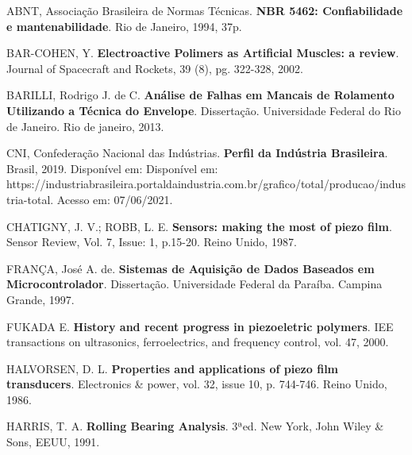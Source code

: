 \documentclass[
	12pt,				
	oneside,			
	a4paper,			
	english,			
	brazil,			
	]{abntex2ppgsi}
\begin{document}
\postextual


%


\begin{thebibliography}{9}

  ABNT, Associação Brasileira de Normas Técnicas.
  \textbf{NBR 5462: Confiabilidade e mantenabilidade}.
  Rio de Janeiro, 1994, 37p.

  BAR-COHEN, Y.
  \textbf{Electroactive Polimers as Artificial Muscles: a review}.
  Journal of Spacecraft and Rockets, 39 (8), pg. 322-328, 2002.

  BARILLI, Rodrigo J. de C.
  \textbf{Análise de Falhas em Mancais de Rolamento Utilizando a Técnica do Envelope}.
  Dissertação. Universidade Federal do Rio de Janeiro. Rio de janeiro, 2013.
  
 CNI, Confederação Nacional das Indústrias.
  \textbf{Perfil da Indústria Brasileira}.
  Brasil, 2019. Disponível em: Disponível em: https://industriabrasileira.portaldaindustria.com.br/grafico/total/producao/industria-total. Acesso em: 07/06/2021.
  
 CHATIGNY, J. V.; ROBB, L. E.
  \textbf{Sensors: making the most of piezo film}.
  Sensor Review, Vol. 7, Issue: 1, p.15-20. Reino Unido, 1987.

 FRANÇA, José A. de.
  \textbf{Sistemas de Aquisição de Dados Baseados em Microcontrolador}.
  Dissertação. Universidade Federal da Paraíba. Campina Grande, 1997.
  
 
  FUKADA E.
  \textbf{History and recent progress in piezoeletric polymers}.
  IEE transactions on ultrasonics, ferroelectrics, and frequency control, vol. 47, 2000.

  HALVORSEN, D. L.
  \textbf{Properties and applications of piezo film transducers}.
  Electronics \& power, vol. 32, issue 10, p. 744-746. Reino Unido, 1986.

  HARRIS, T. A.
  \textbf{Rolling Bearing Analysis}.
  3ªed. New York, John Wiley \& Sons, EEUU, 1991.


\end{thebibliography}
\end{document}
